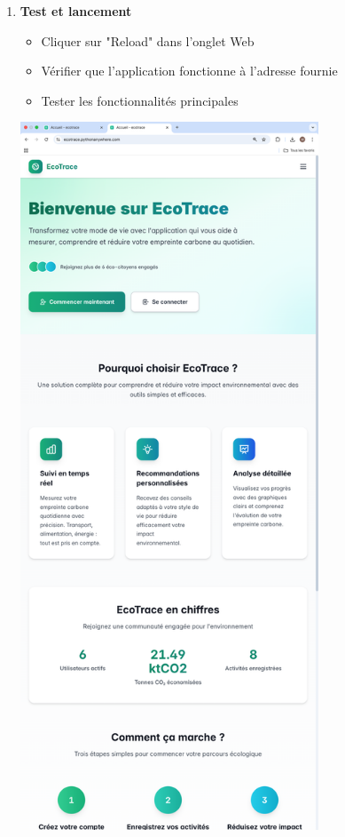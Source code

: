 \documentclass[a4paper,11pt]{article}
\begin{document}
\begin{enumerate}
                    \item \textbf{Test et lancement}
                        \begin{itemize}
                            \item Cliquer sur "Reload" dans l'onglet Web
                            \item Vérifier que l'application fonctionne à l'adresse fournie
                            \item Tester les fonctionnalités principales
                        \end{itemize}

                        \begin{center}
                            \includegraphics[width=0.7\textwidth]{captures/servir/prod/img2.png}

\end{center}
\end{enumerate}
\end{document}
